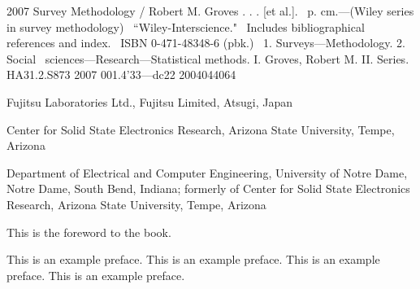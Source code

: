 \documentclass{wileySix}
\begin{document}
\subtitle{This is the Subtitle}




\halftitlepage

\titlepage


\begin{copyrightpage}{2007}
Survey Methodology / Robert M. Groves . . . [et al.].
\       p. cm.---(Wiley series in survey methodology)
\    ``Wiley-Interscience."
\    Includes bibliographical references and index.
\    ISBN 0-471-48348-6 (pbk.)
\    1. Surveys---Methodology.  2. Social 
\  sciences---Research---Statistical methods.  I. Groves, Robert M.  II. %
Series.\\

HA31.2.S873 2007
001.4'33---dc22                                             2004044064
\end{copyrightpage}

\dedication{To my parents}

\begin{contributors}
 Fujitsu Laboratories Ltd., Fujitsu Limited, Atsugi,
Japan

 Center for Solid State Electronics Research, Arizona
State University, Tempe, Arizona

 Department of Electrical and
Computer Engineering, University of Notre Dame, Notre Dame, South Bend, 
Indiana; formerly of
Center for Solid State Electronics Research, Arizona
State University, Tempe, Arizona 
\end{contributors}

\contentsinbrief
\tableofcontents
\listoffigures
\listoftables


\begin{foreword}
This is the foreword to the book.
\end{foreword}

\begin{preface}
This is an example preface.
This is an example preface.
This is an example preface.
This is an example preface.


\end{preface}
\end{document}
